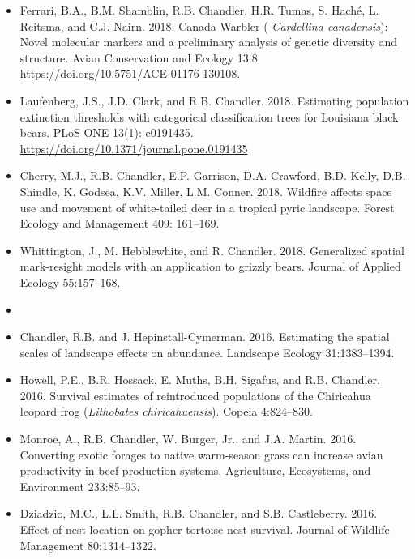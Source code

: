 \begin{itemize}
\item Ferrari, B.A., B.M. Shamblin, R.B. Chandler, H.R. Tumas, S. Hach\'e,
  L. Reitsma, and C.J. Nairn. 2018. Canada Warbler ({\it
  Cardellina canadensis}): Novel molecular markers and a preliminary
  analysis of genetic diversity and structure. Avian Conservation and
  Ecology 13:8 \url{https://doi.org/10.5751/ACE-01176-130108}.

\item Laufenberg, J.S., J.D. Clark, and
  R.B. Chandler. 2018. Estimating population extinction thresholds 
  with categorical classification trees for Louisiana black
  bears. PLoS ONE 13(1): e0191435.
  \url{https://doi.org/10.1371/journal.pone.0191435}

\item Cherry, M.J., R.B. Chandler, E.P. Garrison, D.A. Crawford,
  B.D. Kelly, D.B. Shindle, K. Godsea, K.V. Miller,
  L.M. Conner. 2018. Wildfire affects space use and movement of
  white-tailed deer in a tropical pyric landscape. Forest Ecology and
  Management 409: 161--169. 

\item Whittington, J., M. Hebblewhite, and
  R. Chandler. 2018. Generalized spatial mark-resight models with an 
  application to grizzly bears. Journal of Applied Ecology
  55:157--168. 



\item[] { \\}

\item Chandler, R.B. and J. Hepinstall-Cymerman. 2016. Estimating
  the spatial scales of landscape effects on abundance. Landscape
  Ecology 31:1383--1394. 

\item Howell, P.E., B.R. Hossack, E. Muths, B.H. Sigafus, and
  R.B. Chandler. 2016. Survival estimates of reintroduced populations
  of the Chiricahua leopard frog ({\it Lithobates
    chiricahuensis}). Copeia 4:824--830.   

\item Monroe, A., R.B. Chandler, W. Burger, Jr., and J.A. Martin. 2016. 
  Converting exotic forages to native warm-season grass can
  increase avian productivity in beef production systems. Agriculture,
  Ecosystems, and Environment 233:85--93. 

\item Dziadzio, M.C., L.L. Smith, R.B. Chandler, and
  S.B. Castleberry. 2016. Effect of nest location on gopher
  tortoise nest survival. Journal of Wildlife Management 80:1314--1322.


\end{itemize}
